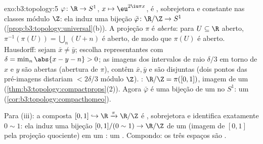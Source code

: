 \begin{solution}{exo:b3:topology:5}
$\varphi \colon \R \to S^1$, $x \mapsto \eu^{2\iu\pi x}$, é
, sobrejetora e constante nas classes módulo $\Z$: ela
induz uma bijeção  $\bar\varphi \colon \R/\Z \to
S^1$ (\cref{prop:b3:topology:universal}(b)). A projeção
$\pi$ é \emph{aberta}: para $U \subseteq \R$ aberto,
$\pi^{-1}(\pi(U)) = \bigcup_{n}(U + n)$ é aberto, de modo que $\pi(U)$ é
aberto. Hausdorff: sejam $\bar x \neq \bar y$; escolha
representantes com $\delta = \min_{n}\abs{x - y - n} > 0$;
as imagens dos intervalos de raio $\delta/3$ em torno de $x$ e
$y$ são abertas (abertura de $\pi$), contêm $\bar x, \bar y$ e
são disjuntas (dois pontos das pré-imagens distariam $< 2\delta/3$
módulo $\Z$). : $\R/\Z = \pi([0,1])$, imagem  de
um  (\cref{thm:b3:topology:compactprops}(2)). Agora
$\bar\varphi$ é uma bijeção  de um  no
 $S^1$: um 
(\cref{cor:b3:topology:compacthomeo}).

Para (iii): a composta $[0,1] \hookrightarrow \R
\xrightarrow{\pi} \R/\Z$ é , sobrejetora e
identifica exatamente $0 \sim 1$: ela induz uma bijeção 
$[0,1]/(0\sim1) \to \R/\Z$ de um  (imagem
 de $[0,1]$ pela projeção quociente) em um :
um . Compondo: os três espaços são
.
\end{solution}

